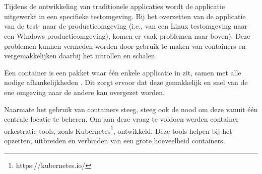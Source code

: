 
\chapter{}
\label{ch:inleiding}



Tijdens de ontwikkeling van traditionele applicaties wordt de applicatie uitgewerkt in een specifieke testomgeving. Bij het overzetten van de applicatie van de test- naar de productieomgeving (i.e., van een Linux testomgeving naar een Windows productieomgeving), komen er vaak problemen naar boven). Deze problemen kunnen vermeden worden door gebruik te maken van containers en vergemakkelijken daarbij het uitrollen en schalen.

Een container is een pakket waar één enkele applicatie in zit, samen met alle nodige afhankelijkheden \autocite{Education2019}. Dit zorgt ervoor dat deze gemakkelijk en snel van de ene omgeving naar de andere kan overgezet worden.

Naarmate het gebruik van containers steeg, steeg ook de nood om deze vanuit één centrale locatie te beheren. Om aan deze vraag te voldoen werden container orkestratie tools, zoals Kubernetes\footnote{https://kubernetes.io/}, ontwikkeld. Deze tools helpen bij het opzetten, uitbreiden en verbinden van een grote hoeveelheid containers.

